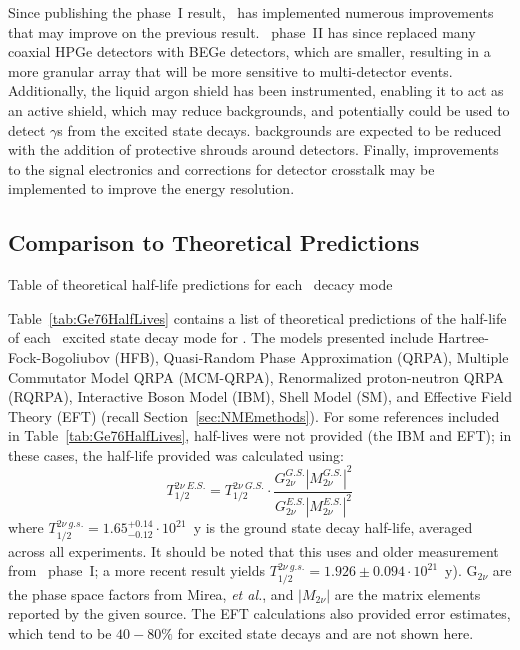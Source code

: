 \documentclass[/main.tex]{subfiles}
\begin{document}
Since publishing the phase~I result\cite{gerdaESresult}, \Gerda\ has implemented numerous improvements that may improve on the previous result\cite{gerda2018}.
\Gerda\ phase~II has since replaced many coaxial HPGe detectors with BEGe detectors, which are smaller, resulting in a more granular array that will be more sensitive to multi-detector events.
Additionally, the liquid argon shield has been instrumented, enabling it to act as an active shield, which may reduce backgrounds, and potentially could be used to detect $\gamma$s from the excited state decays.
 backgrounds are expected to be reduced with the addition of protective shrouds around detectors.
Finally, improvements to the signal electronics and corrections for detector crosstalk may be implemented to improve the energy resolution.

\subsection{Comparison to Theoretical Predictions}
\begin{table}[p]
  \caption[Current half-live limits and predictions for all \tnbb-decay modes of ]{\label{tab:Ge76HalfLives}
    Table of theoretical half-life predictions for each \tnbb\ decacy mode
  }
  \small
  
\end{table}
Table~\ref{tab:Ge76HalfLives} contains a list of theoretical predictions of the half-life of each \tnbb\ excited state decay mode for .
The models presented include Hartree-Fock-Bogoliubov (HFB), Quasi-Random Phase Approximation (QRPA), Multiple Commutator Model QRPA (MCM-QRPA), Renormalized proton-neutron QRPA (RQRPA), Interactive Boson Model (IBM), Shell Model (SM), and  Effective Field Theory (EFT) (recall Section~\ref{sec:NMEmethods}).
For some references included in Table~\ref{tab:Ge76HalfLives}, half-lives were not provided (the IBM\cite{barea2013, barea2015} and EFT\cite{menendez2018}); in these cases, the half-life provided was calculated using:
\begin{equation} \label{eq:hlcalc}
  T^{2\nu~E.S.}_{1/2} = T^{2\nu~G.S.}_{1/2}\cdot\frac{G_{2\nu}^{G.S.}|M_{2\nu}^{G.S.}|^2}{G_{2\nu}^{E.S.}|M_{2\nu}^{E.S.}|^2}
\end{equation}
where $T_{1/2}^{2\nu~g.s.}=1.65^{+0.14}_{-0.12}\cdot10^{21}$~y is the ground state decay half-life, averaged across all experiments\cite{barabash2015}.
It should be noted that this uses and older measurement from \Gerda\ phase~I; a more recent result yields $T_{1/2}^{2\nu~g.s.}=1.926\pm0.094\cdot10^{21}$~y\cite{gerda2015}).
$\mathrm{G}_{2\nu}$ are the phase space factors from Mirea, \textit{et al.}\cite{mirea2015}, and $|M_{2\nu}|$ are the matrix elements reported by the given source.
The EFT calculations\cite{menendez2018} also provided error estimates, which tend to be $40-80\%$ for excited state decays and are not shown here.
\end{document}
